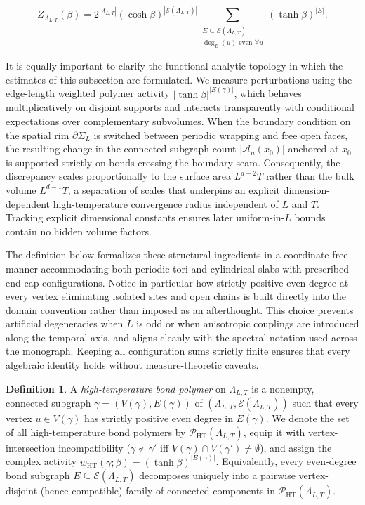 \documentclass[11pt]{article}
\theoremstyle{definition}
\newtheorem{definition}[theorem]{Definition}
\begin{document}
\[
  Z_{\Lambda_{L,T}}(\beta) = 2^{|\Lambda_{L,T}|} (\cosh \beta)^{|\mathcal{E}(\Lambda_{L,T})|} \sum_{\substack{E \subseteq \mathcal{E}(\Lambda_{L,T}) \\ \deg_E(u) \text{ even } \forall u}} (\tanh \beta)^{|E|}.
\]

It is equally important to clarify the functional-analytic topology in which the
estimates of this subsection are formulated. We measure perturbations using the
edge-length weighted polymer activity $|\tanh \beta|^{|E(\gamma)|}$, which behaves
multiplicatively on disjoint supports and interacts transparently with conditional
expectations over complementary subvolumes. When the boundary condition on the
spatial rim $\partial \Sigma_L$ is switched between periodic wrapping and free open
faces, the resulting change in the connected subgraph count $|\mathcal{A}_n(x_0)|$
anchored at $x_0$ is supported strictly on bonds crossing the boundary seam.
Consequently, the discrepancy scales proportionally to the surface area $L^{d-2} T$
rather than the bulk volume $L^{d-1} T$, a separation of scales that underpins an
explicit dimension-dependent high-temperature convergence radius independent of $L$
and $T$. Tracking explicit dimensional constants ensures later uniform-in-$L$ bounds
contain no hidden volume factors.

The definition below formalizes these structural ingredients in a coordinate-free
manner accommodating both periodic tori and cylindrical slabs with prescribed
end-cap configurations. Notice in particular how strictly positive even degree at
every vertex eliminating isolated sites and open chains is built directly into the
domain convention rather than imposed as an afterthought. This choice prevents
artificial degeneracies when $L$ is odd or when anisotropic couplings are introduced
along the temporal axis, and aligns cleanly with the spectral notation used across
the monograph. Keeping all configuration sums strictly finite ensures that every
algebraic identity holds without measure-theoretic caveats.

\begin{definition}
\label{def:s04-bond-graph}
A \emph{high-temperature bond polymer} on $\Lambda_{L,T}$ is a nonempty, connected
subgraph $\gamma = (V(\gamma), E(\gamma))$ of $(\Lambda_{L,T},
\mathcal{E}(\Lambda_{L,T}))$ such that every vertex $u \in V(\gamma)$ has strictly
positive even degree in $E(\gamma)$. We denote the set of all high-temperature bond
polymers by $\mathcal{P}_{\mathrm{HT}}(\Lambda_{L,T})$, equip it with
vertex-intersection incompatibility ($\gamma \not\sim \gamma'$ iff $V(\gamma) \cap
V(\gamma') \neq \emptyset$), and assign the complex activity
$w_{\mathrm{HT}}(\gamma; \beta) = (\tanh \beta)^{|E(\gamma)|}$. Equivalently, every
even-degree bond subgraph $E \subseteq \mathcal{E}(\Lambda_{L,T})$ decomposes
uniquely into a pairwise vertex-disjoint (hence compatible) family of connected
components in $\mathcal{P}_{\mathrm{HT}}(\Lambda_{L,T})$.
\end{definition}
\end{document}
